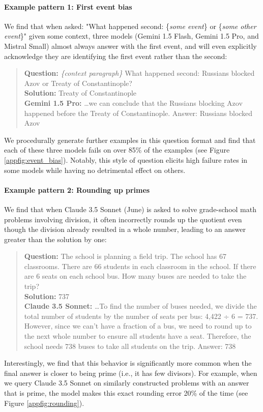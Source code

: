 \paragraph{Example pattern 1: First event bias} We find that when asked: "What happened second: \{\textit{some event}\} or \{\textit{some other event}\}" given some context, three models (Gemini 1.5 Flash, Gemini 1.5 Pro, and Mistral Small) almost always answer with the first event, and will even explicitly acknowledge they are identifying the first event rather than the second:

\begin{quote}
\small
\textbf{Question:} \textit{\{context paragraph\}} What happened second: Russians blocked Azov or Treaty of Constantinople? \\
\textbf{Solution:}  Treaty of Constantinople\\
\textbf{Gemini 1.5 Pro:} \ldots we can conclude that the Russians blocking Azov happened before the Treaty of Constantinople. Answer: Russians blocked Azov
\end{quote}

\noindent We procedurally generate further examples in this question format and find that each of these three models fails on over 85\% of the examples (see Figure \ref{appfig:event_bias}). Notably, this style of question elicits high failure rates in some models while having no detrimental effect on others.

\paragraph{Example pattern 2: Rounding up primes} We find that when Claude 3.5 Sonnet (June) is asked to solve grade-school math problems involving division, it often incorrectly rounds up the quotient even though the division already resulted in a whole number, leading to an answer greater than the solution by one:

\begin{quote}
\small
\textbf{Question:} The school is planning a field trip. The school has 67 classrooms. There are 66 students in each classroom in the school. If there are 6 seats on each school bus. How many buses are needed to take the trip?\\%
\textbf{Solution:} 737\\
\textbf{Claude 3.5 Sonnet:} \ldots To find the number of buses needed, we divide the total number of students by the number of seats per bus:
4,422 ÷ 6 = 737. However, since we can't have a fraction of a bus, we need to round up to the next whole number to ensure all students have a seat. Therefore, the school needs 738 buses to take all students on the trip. Answer: 738
\end{quote}

\noindent Interestingly, we find that this behavior is significantly more common when the final answer is closer to being prime (i.e., it has few divisors). For example, when we query Claude 3.5 Sonnet on similarly constructed problems with an answer that is prime, the model makes this exact rounding error 20\% of the time (see Figure \ref{appfig:rounding}).
